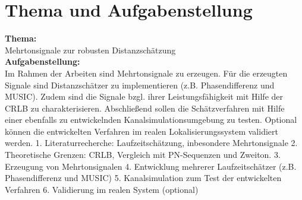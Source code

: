 \chapter*{Thema und Aufgabenstellung}\thispagestyle{empty}
\label{sec:thema}

\vspace{-0.2cm}
\textbf{Thema:}\\
Mehrtonsignale zur robusten Distanzschätzung\\

\noindent\textbf{Aufgabenstellung:}\\
\normalsize Im Rahmen der Arbeiten sind Mehrtonsignale zu erzeugen. Für die erzeugten Signale sind Distanzschätzer zu
implementieren (z.B. Phasendifferenz und MUSIC). Zudem sind die Signale bzgl. ihrer Leistungsfähigkeit mit
Hilfe der CRLB zu charakterisieren. Abschließend sollen die Schätzverfahren mit Hilfe einer ebenfalls zu
entwickelnden Kanalsimulationsumgebung zu testen. Optional können die entwickelten Verfahren im realen
Lokalisierungssystem validiert werden. 1. Literaturrecherche: Laufzeitschätzung, inbesondere Mehrtonsignale
2. Theoretische Grenzen: CRLB, Vergleich mit PN-Sequenzen und Zweiton. 3. Erzeugung von
Mehrtonsignalen 4. Entwicklung mehrerer Laufzeitschätzer (z.B. Phasendifferenz und MUSIC) 5.
Kanalsimulation zum Test der entwickelten Verfahren 6. Validierung im realen System (optional)
